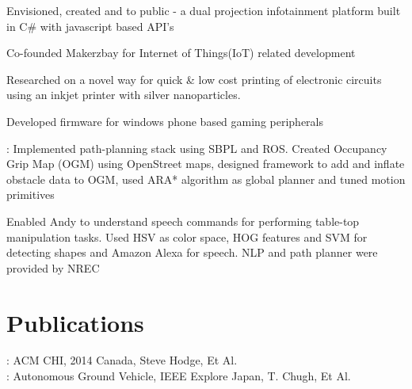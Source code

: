 \documentclass[]{resume-openfont}
\begin{document}
\begin{minipage}[t]{0.63\textwidth}
\begin{tightemize}
\item Envisioned, created and \href{https://github.com/Microsoft/kinect-ripple}{} to public \href{https://www.youtube.com/watch?v=_0K4iZdMjLw}{} - a dual projection infotainment platform built in C\# with javascript based API's
\item Co-founded Makerzbay for Internet of Things(IoT) related development 
\end{tightemize}
\sectionsep

\begin{tightemize}
\item  Researched on a novel way for quick \& low cost printing of electronic circuits using an inkjet printer with silver nanoparticles.
\item Developed firmware for windows phone based gaming peripherals 
\end{tightemize}
\sectionsep

\begin{tightemize}
\item \href{https://mrsdprojects.ri.cmu.edu/2015teamb/media/fall-and-spring-videos/}{}: Implemented path-planning stack using SBPL and ROS. Created Occupancy Grip  Map (OGM) using OpenStreet maps, designed framework to add and inflate obstacle data to OGM, used ARA* algorithm as global planner and tuned motion primitives
\item \href{http://www.tusharchugh.com/works/andy/}{} 
Enabled Andy to understand speech commands for performing table-top manipulation tasks. Used HSV as color space, HOG features and SVM for detecting shapes and Amazon Alexa for speech. NLP and path planner were provided by NREC
\end{tightemize}
\sectionsep


\section{Publications}
\href{http://research.microsoft.com/pubs/207114/2014-02-14\%20CHI\%20sticker\%20circuits.pdf}{}: ACM CHI, 2014 Canada, Steve Hodge, Et Al. \\
\href{http://ieeexplore.ieee.org/xpl/login.jsp?tp=&arnumber=5558532&url=http\%3A\%2F\%2Fieeexplore.ieee.org\%2Fxpls\%2Fabs_all.jsp\%3Farnumber\%3D5558532}{}: Autonomous Ground Vehicle, IEEE Explore Japan, T. Chugh, Et Al.



\end{minipage}
\end{document}

